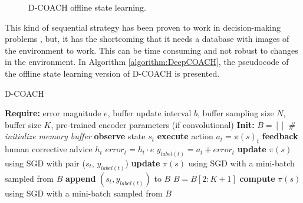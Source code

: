 \begin{figure}
\centering
{}
\hspace{0.1cm}
\caption{D-COACH offline state learning.} 
\label{fig:ms} 
\end{figure}

This kind of sequential strategy has been proven to work in decision-making problems \cite{Warnell2017,Finn2015,Ha2018}, but, it has the shortcoming that it needs a database with images of the environment to work. This can be time consuming and not robust to changes in the environment. In Algorithm \ref{algorithm:DeepCOACH}, the pseudocode of the offline state learning version of D-COACH is presented.

\begin{algorithm}[t]
\caption{D-COACH }\label{algorithm:DeepCOACH}
\begin{algorithmic}[1]
\State \textbf{Require:} error magnitude $e$, buffer update interval $b$, buffer sampling size $N$, buffer size $K$, pre-trained encoder parameters (if convolutional) 
\State \textbf{Init:} $B = []$  \emph{\# initialize memory buffer}
\State \textbf{observe} state $s_{t}$
\State \textbf{execute} action $a_{t}=\pi(s)_{t}$
\State \textbf{feedback} human corrective advice $h_{t}$
\State $\mathit{error}_{t} = h_{t}\cdot e$
\State $y_{label(t)} = a_{t} + \mathit{error}_{t}$ 
\State \textbf{update} $\pi(s)$ using SGD with pair ($s_{t}$, $y_{\mathit{label}(t)}$) 
\State \textbf{update} $\pi(s)$ using SGD with a mini-batch sampled from $B$
\State \textbf{append} $(s_{t}, y_{\mathit{label}(t)})$ to $B$
\State $B = B[2:K+1]$
\EndIf
\EndIf
{}
\State \textbf{compute} $\pi(s)$ using SGD with a mini-batch sampled from $B$
\EndIf
\EndFor
\end{algorithmic}
\end{algorithm}

